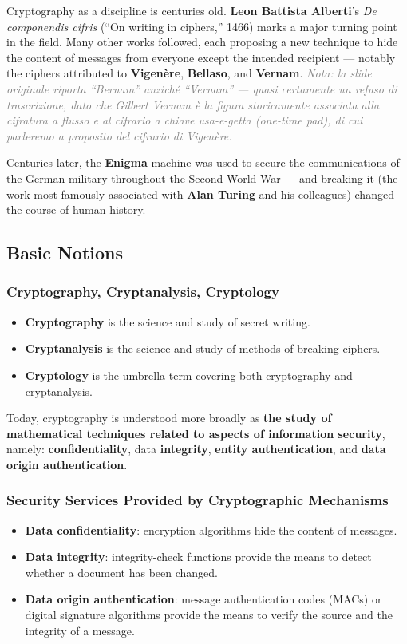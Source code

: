 \documentclass[12pt, a4paper]{article}
\begin{document}
Cryptography as a discipline is centuries old. \textbf{Leon Battista Alberti}'s \emph{De componendis cifris} (``On writing in ciphers,'' 1466) marks a major turning point in the field. Many other works followed, each proposing a new technique to hide the content of messages from everyone except the intended recipient — notably the ciphers attributed to \textbf{Vigenère}, \textbf{Bellaso}, and \textbf{Vernam}. \textcolor{gray}{\textit{Nota: la slide originale riporta ``Bernam'' anziché ``Vernam'' — quasi certamente un refuso di trascrizione, dato che Gilbert Vernam è la figura storicamente associata alla cifratura a flusso e al cifrario a chiave usa-e-getta (one-time pad), di cui parleremo a proposito del cifrario di Vigenère.}}

Centuries later, the \textbf{Enigma} machine was used to secure the communications of the German military throughout the Second World War — and breaking it (the work most famously associated with \textbf{Alan Turing} and his colleagues) changed the course of human history.

\subsection{Basic Notions}

\subsubsection{Cryptography, Cryptanalysis, Cryptology}
\begin{itemize}
    \item \textbf{Cryptography} is the science and study of secret writing.
    \item \textbf{Cryptanalysis} is the science and study of methods of breaking ciphers.
    \item \textbf{Cryptology} is the umbrella term covering both cryptography and cryptanalysis.
\end{itemize}
Today, cryptography is understood more broadly as \textbf{the study of mathematical techniques related to aspects of information security}, namely: \textbf{confidentiality}, data \textbf{integrity}, \textbf{entity authentication}, and \textbf{data origin authentication}.

\subsubsection{Security Services Provided by Cryptographic Mechanisms}
\begin{itemize}
    \item \textbf{Data confidentiality}: encryption algorithms hide the content of messages.
    \item \textbf{Data integrity}: integrity-check functions provide the means to detect whether a document has been changed.
    \item \textbf{Data origin authentication}: message authentication codes (MACs) or digital signature algorithms provide the means to verify the source and the integrity of a message.
\end{itemize}
\end{document}
